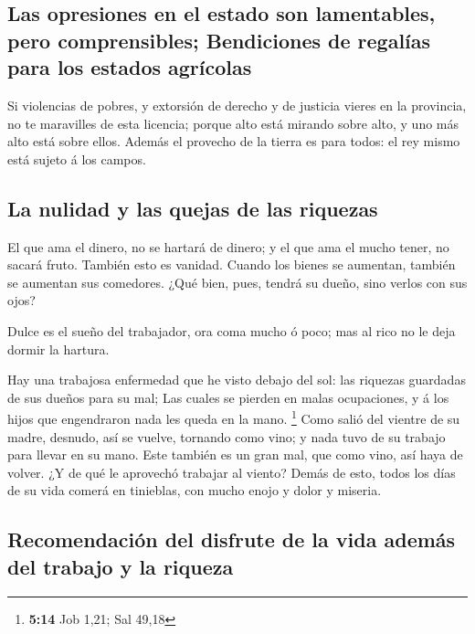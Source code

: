 \hypertarget{las-opresiones-en-el-estado-son-lamentables-pero-comprensibles-bendiciones-de-regaluxedas-para-los-estados-agruxedcolas}{%
\subsection{Las opresiones en el estado son lamentables, pero
comprensibles; Bendiciones de regalías para los estados
agrícolas}\label{las-opresiones-en-el-estado-son-lamentables-pero-comprensibles-bendiciones-de-regaluxedas-para-los-estados-agruxedcolas}}

 Si violencias de pobres, y extorsión de derecho y de
justicia vieres en la provincia, no te maravilles de esta licencia;
porque alto está mirando sobre alto, y uno más alto está sobre ellos.
 Además el provecho de la tierra es para todos: el rey mismo
está sujeto á los campos.

\hypertarget{la-nulidad-y-las-quejas-de-las-riquezas}{%
\subsection{La nulidad y las quejas de las
riquezas}\label{la-nulidad-y-las-quejas-de-las-riquezas}}

 El que ama el dinero, no se hartará de dinero; y el que
ama el mucho tener, no sacará fruto. También esto es vanidad.
 Cuando los bienes se aumentan, también se aumentan sus
comedores. ¿Qué bien, pues, tendrá su dueño, sino verlos con sus ojos?

 Dulce es el sueño del trabajador, ora coma mucho ó poco;
mas al rico no le deja dormir la hartura.

 Hay una trabajosa enfermedad que he visto debajo del sol:
las riquezas guardadas de sus dueños para su mal;  Las
cuales se pierden en malas ocupaciones, y á los hijos que engendraron
nada les queda en la mano. \footnote{\textbf{5:14} Job 1,21; Sal 49,18}
 Como salió del vientre de su madre, desnudo, así se
vuelve, tornando como vino; y nada tuvo de su trabajo para llevar en su
mano.  Este también es un gran mal, que como vino, así haya
de volver. ¿Y de qué le aprovechó trabajar al viento? 
Demás de esto, todos los días de su vida comerá en tinieblas, con mucho
enojo y dolor y miseria.

\hypertarget{recomendaciuxf3n-del-disfrute-de-la-vida-ademuxe1s-del-trabajo-y-la-riqueza}{%
\subsection{Recomendación del disfrute de la vida además del trabajo y
la
riqueza}\label{recomendaciuxf3n-del-disfrute-de-la-vida-ademuxe1s-del-trabajo-y-la-riqueza}}

